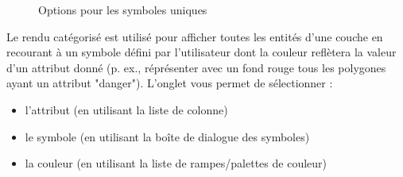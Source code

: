 \begin{figure}[ht]
\centering
   \hspace{1cm}
   \hspace{1cm}
\caption{Options pour les symboles uniques \nixcaption}
\end{figure}


Le rendu catégorisé est utilisé pour afficher toutes les entités d'une couche 
en recourant à un symbole défini par l'utilisateur dont la couleur reflètera 
la valeur d'un attribut donné (p. ex., réprésenter avec un fond rouge tous 
les polygones ayant un attribut "danger"). L'onglet  vous permet de 
sélectionner :

\begin{itemize}[label=--]
\item l'attribut (en utilisant la liste de colonne)
\item le symbole (en utilisant la boîte de dialogue des symboles)
\item la couleur (en utilisant la liste de rampes/palettes de couleur)
\end{itemize}

